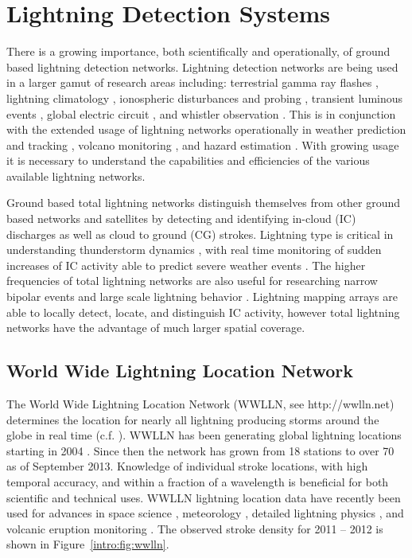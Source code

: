 \section{Lightning Detection Systems}

There is a growing importance, both scientifically and operationally, of ground based lightning detection networks.
Lightning detection networks are being used in a larger gamut of research areas including: terrestrial gamma ray flashes \citep{Dwyer2012, Gjesteland2011, Connaughton2010}, lightning climatology \citep{Virts2013, Virts2011a, Burgesser2012}, ionospheric disturbances and probing \citep{Jacobson2010, Singh2011}, transient luminous events \citep{Soula2011}, global electric circuit  \citep{Holzworth2005}, and whistler observation \citep{Collier2010, Collier2011a, Burkholder2013}.
This is in conjunction with the extended usage of lightning networks operationally in weather prediction and tracking \citep{Fierro2012, Pan2010, Thomas2010d}, volcano monitoring \citep{Doughton2010}, and hazard estimation \citep{Altaratz2010}.
With growing usage it is necessary to understand the capabilities and efficiencies of the various available lightning networks.

Ground based total lightning networks distinguish themselves from other ground based networks and satellites by detecting and identifying in-cloud (IC) discharges as well as cloud to ground (CG) strokes.
Lightning type is critical in understanding thunderstorm dynamics \citep{Williams1989}, with real time monitoring of sudden increases of IC activity able to predict severe weather events \citep{Rudlosky2013, Darden2010, Metzger2013, Schultz2009, Schultz2011}.
The higher frequencies of total lightning networks are also useful for researching narrow bipolar events \citep{Suszcynsky2003} and large scale lightning behavior \citep{Hutchins2013}.
Lightning mapping arrays are able to locally detect, locate, and distinguish IC activity, however total lightning networks have the advantage of much larger spatial coverage.

\subsection{World Wide Lightning Location Network}

The World Wide Lightning Location Network (WWLLN, see http://wwlln.net) determines the location for nearly all lightning producing storms around the globe in real time (c.f. \citet{Jacobson2006c}).
WWLLN has been generating global lightning locations starting in 2004 \citep{Rodger2006, Rodger2009}.
Since then the network has grown from 18 stations to over 70 as of September 2013.
Knowledge of individual stroke locations, with high temporal accuracy, and within a fraction of a wavelength is beneficial for both scientific and technical uses.
WWLLN lightning location data have recently been used for advances in space science \citep{Lay2007, Kumar2009, Collier2009, Holzworth2011, Jacobson2011}, meteorology \citep{Price2009,Thomas2010d}, detailed lightning physics \citep{Connaughton2010}, and volcanic eruption monitoring \citep{Doughton2010}.
The observed stroke density for 2011 -- 2012 is shown in Figure~\ref{intro:fig:wwlln}.

